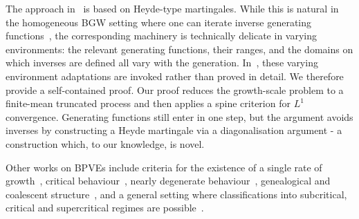 \documentclass[12pt]{article}
\theoremstyle{definition}
\begin{document}
The approach in~\cite{dsouza-rates-of-growth, macphee-schuh} is based on Heyde-type martingales. While this is natural in the homogeneous BGW setting where one can iterate inverse generating functions~\cite{schuh-barbour-infinite-mean}, the corresponding machinery is technically delicate in varying environments: the relevant generating functions, their ranges, and the domains on which inverses are defined all vary with the generation. In~\cite{macphee-schuh, dsouza-rates-of-growth}, these varying environment adaptations are invoked rather than proved in detail. We therefore provide a self-contained proof. Our proof reduces the growth-scale problem to a finite-mean truncated process and then applies a spine criterion for $L^1$ convergence. Generating functions still enter in one step, but the argument avoids inverses by constructing a Heyde martingale via a diagonalisation argument - a construction which, to our knowledge, is novel. 

Other works on BPVEs include criteria for the existence of a single rate of growth~\cite{supercritical-xlogx-biggins, varying-environments-seneta-heyde, kirpicheva2026branchingprocessvaryingenvironment}, critical behaviour~\cite{yaglom-limit-law}, nearly degenerate behaviour~\cite{nearly-degenerate}, genealogical and coalescent structure~\cite{geneological-structure, coalescent-structure}, and a general setting where classifications into subcritical, critical and supercritical regimes are possible~\cite{classification}.
\end{document}
